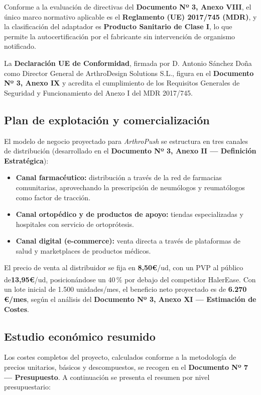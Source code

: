 \documentclass[11pt,a4paper]{article}
\begin{document}
Conforme a la evaluación de directivas del \textbf{Documento Nº 3, Anexo VIII}, el único marco normativo aplicable es el \textbf{Reglamento (UE) 2017/745 (MDR)}, y la clasificación del adaptador es \textbf{Producto Sanitario de Clase I}, lo que permite la autocertificación por el fabricante sin intervención de organismo notificado.

La \textbf{Declaración UE de Conformidad}, firmada por D. Antonio Sánchez Doña como Director General de ArthroDesign Solutions S.L., figura en el \textbf{Documento Nº 3, Anexo IX} y acredita el cumplimiento de los Requisitos Generales de Seguridad y Funcionamiento del Anexo I del MDR 2017/745.

\subsection{Plan de explotación y comercialización}

El modelo de negocio proyectado para \textit{ArthroPush} se estructura en tres canales de distribución (desarrollado en el \textbf{Documento Nº 3, Anexo II — Definición Estratégica}):

\begin{itemize}
    \item \textbf{Canal farmacéutico:} distribución a través de la red de farmacias comunitarias, aprovechando la prescripción de neumólogos y reumatólogos como factor de tracción.
    \item \textbf{Canal ortopédico y de productos de apoyo:} tiendas especializadas y hospitales con servicio de ortoprótesis.
    \item \textbf{Canal digital (e-commerce):} venta directa a través de plataformas de salud y marketplaces de productos médicos.
\end{itemize}

El precio de venta al distribuidor se fija en \textbf{8,50€}/ud, con un PVP al público de\textbf{13,95€}/ud, posicionándose un 40\,\% por debajo del competidor HalerEase\textsuperscript{\textregistered}. Con un lote inicial de 1.500 unidades/mes, el beneficio neto proyectado es de \textbf{6.270\,€/mes}, según el análisis del \textbf{Documento Nº 3, Anexo XI — Estimación de Costes}.

\subsection{Estudio económico resumido}

Los costes completos del proyecto, calculados conforme a la metodología de precios unitarios, básicos y descompuestos, se recogen en el \textbf{Documento Nº 7 — Presupuesto}. A continuación se presenta el resumen por nivel presupuestario:
\end{document}

